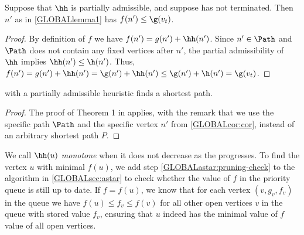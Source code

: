 \begin{cor}\label{GLOBALcor:cor}
  Suppose that $\hh$ is partially admissible, and suppose \A has not terminated.
  Then $n'$ as in \cref{GLOBALlemma1} has $f(n') \leq \g(v_t)$.
\end{cor}
\begin{proof}
  By definition of $f$ we have $f(n') = g(n') + \hh(n')$. Since $n'\in \Path$ and
  $\Path$ does not contain any fixed vertices after $n'$, the partial admissibility of $\hh$
  implies $\hh(n') \leq \h(n')$.
  Thus,
  $f(n') = g(n') + \hh(n') = \g(n') + \hh(n') \leq \g(n') + \h(n') = \g(v_t)$.
\end{proof}
\begin{thm}\label{GLOBALthm:partial-admissible}
  \A with a partially admissible heuristic finds a shortest path.
\end{thm}
\begin{proof}
  The proof of Theorem 1 in \citet{hart1968formal} applies, with the remark that we use the
  specific path $\Path$ and the specific vertex $n'$ from \cref{GLOBALcor:cor}, instead
  of an arbitrary shortest path $P$.
\end{proof}

\begin{remark}\label{GLOBALremark:monotone}
  We call $\hh(u)$ \emph{monotone} when it does not decrease as the \A
  progresses. To find the vertex $u$ with minimal $f(u)$, we add
  step \cref{GLOBALastar:pruning-check} to the \A algorithm in \cref{GLOBALsec:astar} to check
  whether the value of $f$ in the priority queue is still up to date.
  If $f=f(u)$, we know that for each vertex $(v, g_v, f_v)$ in the queue we have
  $f(u)\leq f_v\leq f(v)$ for
  all other open vertices $v$ in the queue with stored value $f_v$, ensuring that
  $u$ indeed has the minimal value of $f$ value of all open vertices.
\end{remark}
